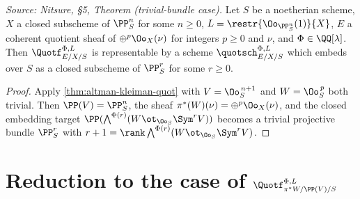 \begin{theorem}
  \label{thm:quot-pn}
  \textit{Source: Nitsure, §5, Theorem (trivial-bundle case).}
  Let $S$ be a noetherian scheme, $X$ a closed subscheme of $\PP^n_S$ for some
  $n \ge 0$, $L = \restr{\Oo_{\PP^n_S}(1)}{X}$, $E$ a coherent quotient sheaf of
  $\oplus^p \Oo_X(\nu)$ for integers $p \ge 0$ and $\nu$, and
  $\Phi \in \QQ[\lambda]$. Then $\Quotf_{E/X/S}^{\Phi,L}$ is representable by a
  scheme $\quotsch_{E/X/S}^{\Phi,L}$ which embeds over $S$ as a closed subscheme
  of $\PP^r_S$ for some $r \ge 0$.
\end{theorem}

\begin{proof}
  Apply \cref{thm:altman-kleiman-quot} with $V = \Oo_S^{\,n+1}$ and
  $W = \Oo_S^{\,p}$ both trivial. Then $\PP(V) = \PP^n_S$, the sheaf
  $\pi^*(W)(\nu) = \oplus^p \Oo_X(\nu)$, and the closed embedding target
  $\PP(\bigwedge^{\Phi(r)}(W \ot_{\Oo_S}\Sym^r V))$ becomes a trivial projective
  bundle $\PP^r_S$ with $r + 1 = \rank \bigwedge^{\Phi(r)}(W \ot_{\Oo_S}\Sym^r V)$.
\end{proof}

\bigskip
\section*{Reduction to the case of $\Quotf_{\pi^*W/\PP(V)/S}^{\Phi,L}$}
\medskip

